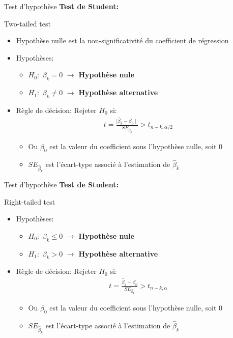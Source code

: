 \documentclass{beamer}
\begin{document}
\begin{frame}{Test d'hypothèse}
\textbf{Test de Student:}
\begin{block}{Two-tailed test}
\begin{itemize}
\item Hypothèse nulle est la non-significativité du coefficient de régression
\item Hypothèses:
\begin{itemize}
\item $H_0:$ $\beta_k=0$ $\rightarrow$ \textbf{Hypothèse nule}
\item $H_1:$ $\beta_k \neq 0$ $\rightarrow$ \textbf{Hypothèse alternative}
\end{itemize}
\item Règle de décision:
Rejeter $H_0$ si:
\begin{align*}
t=\frac{\mid \hat{\beta}_k-\beta_0 \mid}{SE_{\hat{\beta}_k}} > t_{n-k,\alpha/2}
\end{align*}
\begin{itemize}
\item Ou $\beta_0$ est la valeur du coefficient sous l'hypothèse nulle, soit 0
\item $SE_{\hat{\beta}_k}$ est l'écart-type associé à l'estimation de $\hat{\beta}_k$
\end{itemize}
\end{itemize}
\end{block}
\end{frame}

\begin{frame}{Test d'hypothèse}
\textbf{Test de Student:}
\begin{block}{Right-tailed test}
\begin{itemize}
\item Hypothèses:
\begin{itemize}
\item $H_0:$ $\beta_k \leq 0$ $\rightarrow$ \textbf{Hypothèse nule}
\item $H_1:$ $\beta_k > 0$ $\rightarrow$ \textbf{Hypothèse alternative}
\end{itemize}
\item Règle de décision:
Rejeter $H_0$ si:
\begin{align*}
t=\frac{\hat{\beta}_k-\beta_0}{SE_{\hat{\beta}_k}} > t_{n-k,\alpha}
\end{align*}
\begin{itemize}
\item Ou $\beta_0$ est la valeur du coefficient sous l'hypothèse nulle, soit 0
\item $SE_{\hat{\beta}_k}$ est l'écart-type associé à l'estimation de $\hat{\beta}_k$
\end{itemize}
\end{itemize}
\end{block}
\end{frame}
\end{document}
